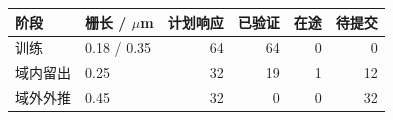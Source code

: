 \begin{tabular}{llrrrr}
\toprule
阶段 & 栅长 / $\mu$m & 计划响应 & 已验证 & 在途 & 待提交 \\
\midrule
训练 & 0.18 / 0.35 & 64 & 64 & 0 & 0 \\
域内留出 & 0.25 & 32 & 19 & 1 & 12 \\
域外外推 & 0.45 & 32 & 0 & 0 & 32 \\
\bottomrule
\end{tabular}
